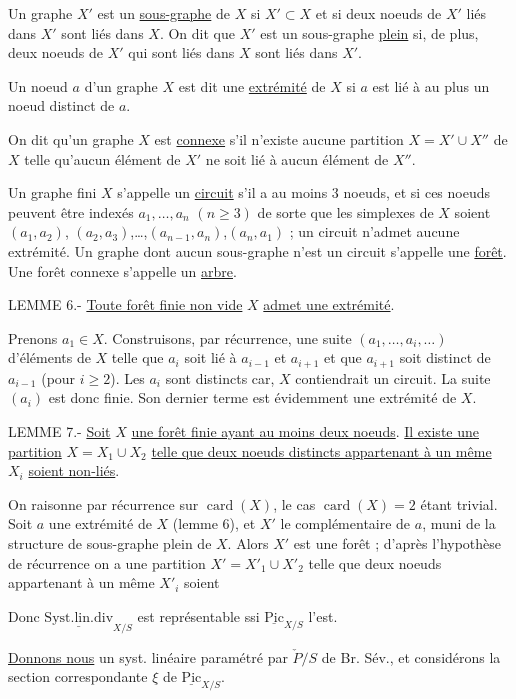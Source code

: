 Un graphe $X'$ est un \uline{sous-graphe} de $X$ si $X'\subset X$ et si deux noeuds de $X'$ liés dans $X'$ sont liés dans $X$. On dit que $X'$ est un sous-graphe \uline{plein} si, de plus, deux noeuds de $X'$ qui sont liés dans $X$ sont liés dans $X'$.

Un noeud $a$ d'un graphe $X$ est dit une \uline{extrémité} de $X$ si $a$ est lié à au plus un noeud distinct de $a$.

On dit qu'un graphe $X$ est \uline{connexe} s'il n'existe aucune partition $X=X'\cup X''$ de $X$ telle qu'aucun élément de $X'$ ne soit lié à aucun élément de $X''$.

Un graphe fini $X$ s'appelle un \uline{circuit} s'il a au moins $3$ noeuds, et si ces noeuds peuvent être indexés $a_1,\ldots,a_n$ $(n\geqslant3)$ de sorte que les simplexes de $X$ soient $(a_1,a_2)$, $(a_2,a_3)$,\ldots,$(a_{n-1},a_n)$,$(a_n,a_1)$ ; un circuit n'admet aucune extrémité. Un graphe dont aucun sous-graphe n'est un circuit s'appelle une \uline{forêt}. Une forêt connexe s'appelle un \uline{arbre}.

LEMME 6.- \uline{Toute forêt finie non vide} $X$ \uline{admet une extrémité}.

Prenons $a_1\in X$. Construisons, par récurrence, une suite $(a_1,\ldots,a_i,\ldots)$ d'éléments de $X$ telle que $a_i$ soit lié à $a_{i-1}$ et $a_{i+1}$ et que $a_{i+1}$ soit distinct de $a_{i-1}$ (pour $i\geqslant2$). Les $a_i$ sont distincts car,  $X$ contiendrait un circuit. La suite $(a_i)$ est donc finie. Son dernier terme est évidemment une extrémité de $X$.

LEMME 7.- \uline{Soit} $X$ \uline{une forêt finie ayant au moins deux noeuds}. \uline{Il existe une partition} $X=X_1\cup X_2$ \uline{telle que deux noeuds distincts appartenant à un même} $X_i$ \uline{soient non-liés}.

On raisonne par récurrence sur $\operatorname{card}(X)$, le cas $\operatorname{card}(X)=2$ étant trivial. Soit $a$ une extrémité de $X$ (lemme 6), et $X'$ le complémentaire de $a$, muni de la structure de sous-graphe plein de $X$. Alors $X'$ est une forêt ; d'après l'hypothèse de récurrence on a une partition $X'=X'_1\cup X'_2$ telle que deux noeuds appartenant à un même $X'_i$ soient

Donc $\underline{\mathrm{Syst.lin.div}}_{X/S}$ est représentable ssi $\underline{\mathrm{Pic}}_{X/S}$ l'est.

\uline{Donnons nous} un syst. linéaire paramétré par $\check{P}/S$ de Br. Sév., et considérons la section correspondante $\xi$ de $\underline{\mathrm{Pic}}_{X/S}$.

